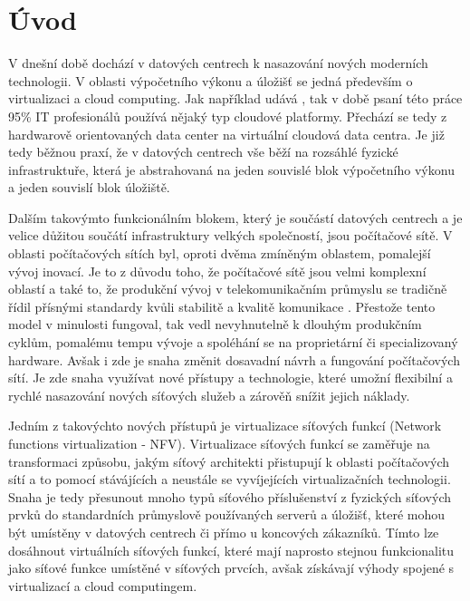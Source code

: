 
\chapter{Úvod}

V dnešní době dochází v datových centrech k nasazování nových moderních technologii. V oblasti výpočetního výkonu a úložišť se jedná především o virtualizaci a cloud computing. Jak například udává \cite{Cloud_adoption} , tak v době psaní této práce 95\% IT profesionálů používá nějaký typ cloudové platformy. Přechází se tedy z hardwarově orientovaných data center na virtuální cloudová data centra. Je již tedy běžnou praxí, že v datových centrech vše běží na rozsáhlé fyzické infrastruktuře, která je abstrahovaná na jeden souvislé blok výpočetního výkonu a jeden souvislí blok úložiště.

Dalším takovýmto funkcionálním blokem, který je součástí datových centrech a je velice důžitou součátí infrastruktury velkých společností, jsou počítačové sítě. V oblasti počítačových sítích byl, oproti dvěma zmíněným oblastem, pomalejší vývoj inovací. Je to z důvodu toho, že počítačové sítě jsou velmi komplexní oblastí a také to, že produkční vývoj v telekomunikačním průmyslu se tradičně řídil přísnými standardy kvůli stabilitě a kvalitě komunikace \cite{telco}. Přestože tento model v minulosti fungoval, tak vedl nevyhnutelně k dlouhým produkčním cyklům, pomalému tempu vývoje a spoléhání se na proprietární či specializovaný hardware. Avšak i zde je snaha změnit dosavadní návrh a fungování počítačových sítí. Je zde snaha využívat nové přístupy a technologie, které umožní flexibilní a rychlé nasazování nových síťových služeb a zárověň snížit jejich náklady.

Jedním z takovýchto nových přístupů je virtualizace síťových funkcí (Network functions virtualization - NFV). Virtualizace síťových funkcí se zaměřuje na transformaci způsobu, jakým síťový architekti přistupují k oblasti počítačových sítí a to pomocí stávájících a neustále se vyvíjejících virtualizačních technologii. Snaha je tedy přesunout mnoho typů síťového příslušenství z fyzických síťových prvků do standardních průmyslově používaných serverů a úložišť, které mohou být umístěny v datových centrech či přímo u koncových zákazníků. Tímto lze dosáhnout virtuálních síťových funkcí, které mají naprosto stejnou funkcionalitu jako síťové funkce umístěné v síťových prvcích, avšak získávají výhody spojené s virtualizací a cloud computingem.

